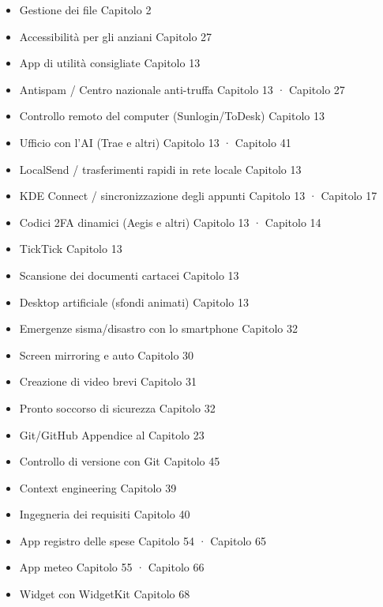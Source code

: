 \begin{itemize}
  \item Gestione dei file Capitolo 2
  \item Accessibilità per gli anziani Capitolo 27
  \item App di utilità consigliate Capitolo 13
  \item Antispam / Centro nazionale anti-truffa Capitolo 13 · Capitolo 27
  \item Controllo remoto del computer (Sunlogin/ToDesk) Capitolo 13
  \item Ufficio con l'AI (Trae e altri) Capitolo 13 · Capitolo 41
  \item LocalSend / trasferimenti rapidi in rete locale Capitolo 13
  \item KDE Connect / sincronizzazione degli appunti Capitolo 13 · Capitolo 17
  \item Codici 2FA dinamici (Aegis e altri) Capitolo 13 · Capitolo 14
  \item TickTick Capitolo 13
  \item Scansione dei documenti cartacei Capitolo 13
  \item Desktop artificiale (sfondi animati) Capitolo 13
  \item Emergenze sisma/disastro con lo smartphone Capitolo 32
  \item Screen mirroring e auto Capitolo 30
  \item Creazione di video brevi Capitolo 31
  \item Pronto soccorso di sicurezza Capitolo 32
  \item Git/GitHub Appendice al Capitolo 23
  \item Controllo di versione con Git Capitolo 45
  \item Context engineering Capitolo 39
  \item Ingegneria dei requisiti Capitolo 40
  \item App registro delle spese Capitolo 54 · Capitolo 65
  \item App meteo Capitolo 55 · Capitolo 66
  \item Widget con WidgetKit Capitolo 68
\end{itemize}
